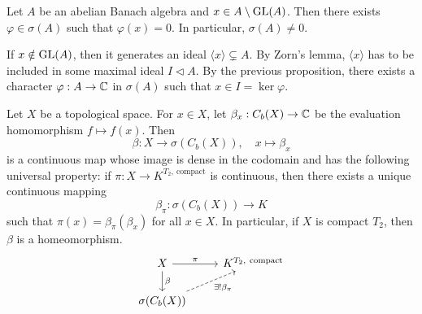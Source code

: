 \begin{corollary}\label{cor:1}
  Let $A$ be an abelian Banach algebra and $x \in A \setminus \operatorname{GL}(A)$.
  Then there exists $\varphi \in \sigma(A)$ such that $\varphi(x) = 0$.
  In particular, $\sigma(A) \neq 0$.
\end{corollary}

\begin{myproof}
  If $x \notin \operatorname{GL}(A)$, then it generates an ideal $\langle x \rangle \subsetneq A$.
  By Zorn's lemma, $\langle x \rangle$ has to be included in some maximal ideal $I \lhd A$.
  By the previous proposition, there exists a character $\varphi: A \to \mathbb {C}$ in $\sigma (A)$
  such that $x \in I = \ker \varphi$.
\end{myproof}

\begin{theorem}
  Let $X$ be a topological space. For $x \in X$, let $\beta_x: C_b (X) \to \mathbb {C}$
  be the evaluation homomorphism $f \mapsto f(x)$. Then 
  $$\beta: X \to \sigma (C_b (X)),\quad x \mapsto \beta_x$$
  is a continuous map whose image is dense in the codomain and has the following universal property:
  if $\pi: X \to K^{T_2,\ \textrm{compact}}$ is continuous, then there exists a unique continuous mapping  
  $$\beta_{\pi} : \sigma (C_b (X)) \to K$$
  such that $\pi(x) = \beta_{\pi} (\beta_x)$ for all $x \in X$.
  In particular, if $X$ is compact $T_2$, then $\beta$ is a homeomorphism.
  \[\begin{tikzcd}
    X & {K^{T_2,\ \textrm{compact}}} \\
    {\sigma(C_b(X))}
    \arrow["\beta", from=1-1, to=2-1]
    \arrow["\pi", from=1-1, to=1-2]
    \arrow["{\exists! \beta_{\pi}}"', dashed, from=2-1, to=1-2]
  \end{tikzcd}\]
\end{theorem}

